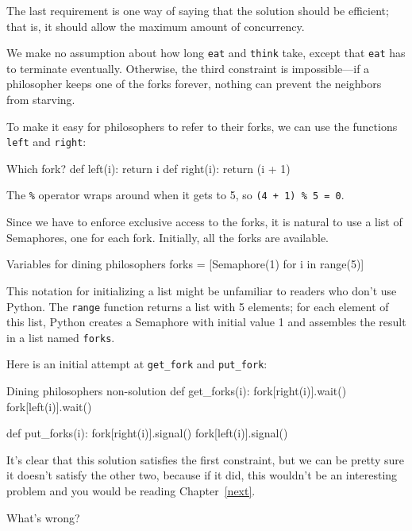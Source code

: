 The last requirement is one way of saying that the solution
should be efficient; that is, it should allow the maximum amount
of concurrency.

We make no assumption about how long {\tt eat} and {\tt think} take,
except that {\tt eat} has to terminate eventually.  Otherwise, the
third constraint is impossible---if a philosopher keeps one of the
forks forever, nothing can prevent the neighbors from starving.

To make it easy for philosophers to refer to their forks,
we can use the functions {\tt left} and {\tt right}:

\begin{lstbox}{Which fork?}
def left(i): return i
def right(i): return (i + 1) %
\end{lstbox}

The {\tt \%} operator wraps around when it gets to 5, so
{\tt (4 + 1) \% 5 = 0}.

Since we have to enforce exclusive access to the forks,
it is natural to use a list of Semaphores, one for
each fork.  Initially, all the forks are available.

\begin{lstbox}{Variables for dining philosophers}
forks = [Semaphore(1) for i in range(5)]
\end{lstbox}

This notation for initializing a list might be unfamiliar to
readers who don't use Python.  The {\tt range} function returns
a list with 5 elements; for each element of this list, Python
creates a Semaphore with initial value 1 and assembles the
result in a list named {\tt forks}.

Here is an initial attempt at {\tt get\_fork} and {\tt put\_fork}:

\begin{lstbox}{Dining philosophers non-solution}
def get_forks(i):
    fork[right(i)].wait()
    fork[left(i)].wait()

def put_forks(i):
    fork[right(i)].signal()
    fork[left(i)].signal()
\end{lstbox}

It's clear that this solution satisfies the first constraint, but
we can be pretty sure it doesn't satisfy the other two, because
if it did, this wouldn't be an interesting problem and you would
be reading Chapter~\ref{next}.

\vspace{1em}
What's wrong?

{}

